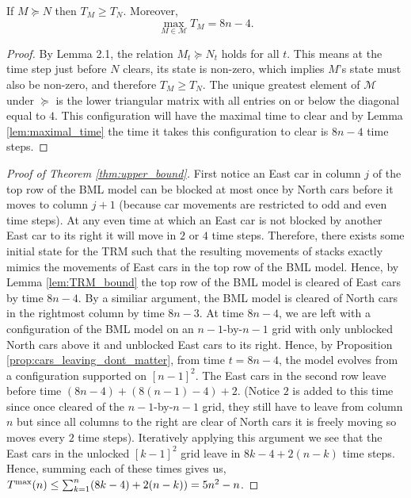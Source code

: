 \documentclass[reqno]{amsart}
\begin{document}
\begin{lemma}\label{lem:TRM_bound}
    If $M \succeq N$ then $T_M \geq T_N$. Moreover,
    $$\max_{M \in \mathcal{M}} T_M = 8n-4.$$
\end{lemma}
\begin{proof}
    By Lemma 2.1, the relation $M_t \succeq N_t$ holds for all $t$. This means at the time step just before $N$ clears, its state is non-zero, which implies $M$'s state must also be non-zero, and therefore $T_M \ge T_N$. The unique greatest element of $\mathcal{M}$ under $\succeq$ is the lower triangular matrix with all entries on or below the diagonal equal to $4$. This configuration will have the maximal time to clear and by Lemma \ref{lem:maximal_time} the time it takes this configuration to clear is $8n-4$ time steps.
\end{proof}


\begin{proof} [Proof of Theorem \ref{thm:upper_bound}]
    First notice an East car in column $j$ of the top row of the BML model can be blocked at most once by North cars before it moves to column $j+1$ (because car movements are restricted to odd and even time steps). At any even time at which an East car is not blocked by another East car to its right it will move in $2$ or $4$ time steps. Therefore, there exists some initial state for the TRM such that the resulting movements of stacks exactly mimics the movements of East cars in the top row of the BML model. Hence, by Lemma \ref{lem:TRM_bound} the top row of the BML model is cleared of East cars by time $8n-4$. By a similiar argument, the BML model is cleared of North cars in the rightmost column by time $8n-3$. At time $8n-4$, we are left with a configuration of the BML model on an $n-1 $-by-$ n-1$ grid with only unblocked North cars above it and unblocked East cars to its right. Hence, by Proposition \ref{prop:cars_leaving_dont_matter}, from time $t=8n-4$, the model evolves from a configuration supported on $ [n-1]^2$. The East cars in the second row leave before time $(8n-4) + (8(n-1)-4)+2$. (Notice $2$ is added to this time since once cleared of the $n-1 $-by-$ n-1$ grid, they still have to leave from column $n$ but since all columns to the right are clear of North cars it is freely moving so moves every $2$ time steps). Iteratively applying this argument we see that the East cars in the unlocked $[k-1]^2$ grid leave in $8k-4 + 2(n-k)$ time steps. Hence, summing each of these times gives us,
    $T^{\text{\rm max}}(n) \leq \sum_{k=1}^n (8k-4) + 2(n-k)) = 5n^2-n$.
\end{proof}
\end{document}
